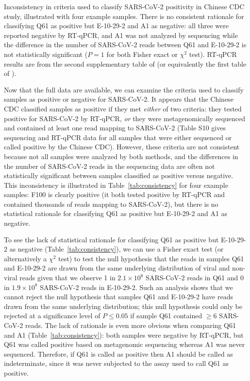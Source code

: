 \documentclass[9pt,twocolumn,twoside]{gsajnl_modified}
\begin{document}
\begin{table}
\caption{
Inconsistency in criteria used to classify SARS-CoV-2 positivity in Chinese CDC study, illustrated with four example samples.
There is no consistent rationale for classifying Q61 as positive but E-10-29-2 and A1 as negative: all three were reported negative by RT-qPCR, and A1 was not analyzed by sequencing while the difference in the number of SARS-CoV-2 reads between Q61 and E-10-29-2 is not statistically significant ($P = 1$ for both Fisher exact or $\chi^2$ test).
RT-qPCR results are from the second supplementary table of \citet{liu2023surveillance} (or equivalently the first table of \citet{liu2022surveillance}).
\label{tab:consistency}
}
\end{table}

Now that the full data are available, we can examine the criteria used to classify samples as positive or negative for SARS-CoV-2.
It appears that the Chinese CDC classified samples as positive if they met \emph{either} of two criteria: they tested positive for SARS-CoV-2 by RT-qPCR, \emph{or} they were metagenomically sequenced and contained at least one read mapping to SARS-CoV-2 (Table S10 gives sequencing and RT-qPCR data for all samples that were either sequenced or called positive by the Chinese CDC).
However, these criteria are not consistent because not all samples were analyzed by both methods, and the differences in the number of SARS-CoV-2 reads in the sequencing data are often not statistically significant between samples classified as positive versus negative.
This inconsistency is illustrated in Table~\ref{tab:consistency} for four example samples: F100 is clearly positive (it both tested positive by RT-qPCR and contained thousands of reads mapping to SARS-CoV-2), but there is no statistical rationale for classifying Q61 as positive but E-10-29-2 and A1 as negative.

To see the lack of statistical rationale for classifying Q61 as positive but E-10-29-2 as negative (Table~\ref{tab:consistency}), we can use a Fisher exact test (or alternatively a $\chi^2$ test) to test the null hypothesis that the reads in samples Q61 and E-10-29-2 are drawn from the same underlying distribution of viral and non-viral reads given that we observe 1 in $2.1 \times 10^8$ SARS-CoV-2 reads in Q61 and 0 in $1.9 \times 10^8$ SARS-CoV-2 reads in E-10-29-2.
Such an analysis shows that we cannot reject the null hypothesis that samples Q61 and E-10-29-2 have reads drawn from the same underlying distribution; this null hypothesis could only be rejected at a significance level of $P \le 0.05$ if sample Q61 contained $\ge$6 SARS-CoV-2 reads.
The lack of rationale is even more obvious when comparing Q61 and A1 (Table~\ref{tab:consistency}): both samples were negative by RT-qPCR, but Q61 was called positive based on metagenomic sequencing whereas A1 was never sequenced.
Therefore, if Q61 is called as positive then A1 should be called as indeterminate, since it was never subjected to the assay used to call Q61 as positive.
\end{document}
